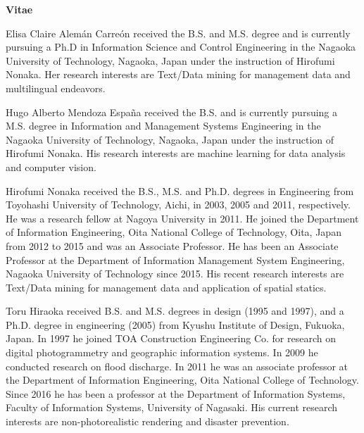 \documentclass{letter}
\begin{document}
\thispagestyle{empty}

\textbf{Vitae}

Elisa Claire Alem\'an Carre\'on received the B.S. and M.S. degree and is currently pursuing a Ph.D in Information Science and Control Engineering in the Nagaoka University of Technology, Nagaoka, Japan under the instruction of Hirofumi Nonaka. Her research interests are Text/Data mining for management data and multilingual endeavors.

Hugo Alberto Mendoza Espa\~na received the B.S. and is currently pursuing a M.S. degree in Information and Management Systems Engineering in the Nagaoka University  of Technology, Nagaoka, Japan under the instruction of Hirofumi Nonaka. His research interests are machine learning for data analysis and computer vision.

Hirofumi Nonaka received the B.S., M.S. and Ph.D. degrees in Engineering from Toyohashi University of Technology, Aichi, in 2003, 2005 and 2011, respectively. He was a research fellow at Nagoya University in 2011. He joined the Department of Information Engineering, Oita National College of Technology, Oita, Japan from 2012 to 2015 and was an Associate Professor. He has been an Associate Professor at the Department of Information Management System Engineering, Nagaoka University of Technology since 2015. His recent research interests are Text/Data mining for management data and application of spatial statics.

Toru Hiraoka received B.S. and M.S. degrees in design (1995 and 1997), and a Ph.D. degree in engineering (2005) from Kyushu Institute of Design, Fukuoka, Japan. In 1997 he joined TOA Construction Engineering Co. for research on digital photogrammetry and geographic information systems. In 2009 he conducted research on flood discharge. In 2011 he was an associate professor at the Department of Information Engineering, Oita National College of Technology. Since 2016 he has been a professor at the Department of Information Systems, Faculty of Information Systems, University of Nagasaki. His current research interests are non-photorealistic rendering and disaster prevention.
\end{document}
